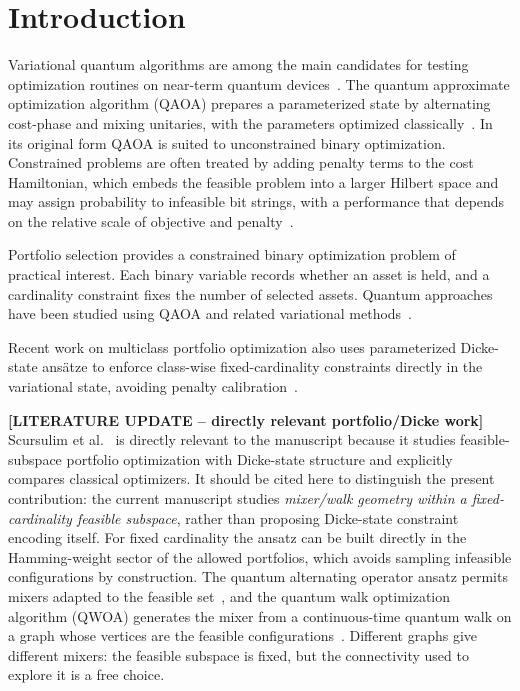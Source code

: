 \section{\label{sec:intro}Introduction}

Variational quantum algorithms are among the main candidates for testing
optimization routines on near-term quantum devices~\cite{Cerezo2021,Moll2018}.
The quantum approximate optimization algorithm (QAOA) prepares a parameterized
state by alternating cost-phase and mixing unitaries, with the parameters
optimized classically~\cite{Farhi2014,Blekos2024}. In its original form QAOA
is suited to unconstrained binary optimization. Constrained problems are often
treated by adding penalty terms to the cost Hamiltonian, which embeds the
feasible problem into a larger Hilbert space and may assign probability to
infeasible bit strings, with a performance that depends on the relative scale
of objective and penalty~\cite{Hadfield2019,Blekos2024}.

Portfolio selection provides a constrained binary optimization problem of
practical interest. Each binary variable records whether an asset is held, and
a cardinality constraint fixes the number of selected assets. Quantum
approaches have been studied using QAOA and related variational
methods~\cite{Hodson2019,Slate2021}.

Recent work on multiclass portfolio optimization also uses parameterized Dicke-state ans\"atze to enforce class-wise fixed-cardinality constraints directly in the variational state, avoiding penalty calibration~\cite{Scursulim2026}.

{\color{red}\textbf{[LITERATURE UPDATE -- directly relevant portfolio/Dicke work]} Scursulim et al.~\cite{Scursulim2026} is directly relevant to the manuscript because it studies feasible-subspace portfolio optimization with Dicke-state structure and explicitly compares classical optimizers. It should be cited here to distinguish the present contribution: the current manuscript studies \emph{mixer/walk geometry within a fixed-cardinality feasible subspace}, rather than proposing Dicke-state constraint encoding itself.} For fixed cardinality the ansatz can be
built directly in the Hamming-weight sector of the allowed portfolios, which
avoids sampling infeasible configurations by construction. The quantum
alternating operator ansatz permits mixers adapted to the feasible
set~\cite{Hadfield2019}, and the quantum walk optimization algorithm (QWOA)
generates the mixer from a continuous-time quantum walk on a graph whose
vertices are the feasible configurations~\cite{Marsh2019,Marsh2020}. Different
graphs give different mixers: the feasible subspace is fixed, but the
connectivity used to explore it is a free choice.

